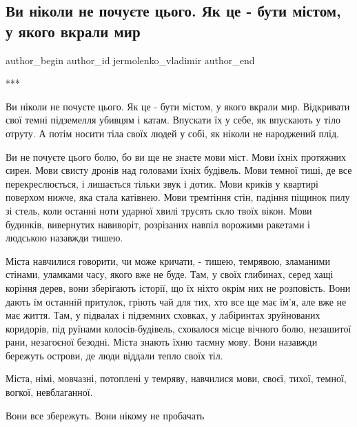  
 
 
 
 

\subsection{Ви ніколи не почуєте цього. Як це - бути містом, у якого вкрали мир}
\label{sec:16_01_2023.fb.jermolenko_vladimir.1.vi_n_koli_ne_pochu_t}

\ifcmt
 author_begin
   author_id jermolenko_vladimir
 author_end
\fi

***

Ви ніколи не почуєте цього. Як це - бути містом, у якого вкрали мир. Відкривати
свої темні підземелля убивцям і катам. Впускати їх у себе, як впускають у тіло
отруту. А потім носити тіла своїх людей у собі, як ніколи не народжений плід.

Ви не почуєте цього болю, бо ви ще не знаєте мови міст. Мови їхніх протяжних
сирен. Мови свисту дронів над головами їхніх будівель. Мови темної тиші, де все
перекреслюється, і лишається тільки звук і дотик. Мови криків у квартирі
поверхом нижче, яка стала катівнею. Мови тремтіння стін, падіння піщинок пилу
зі стель, коли останні ноти ударної хвилі трусять скло твоїх вікон. Мови
будинків, вивернутих навиворіт, розрізаних навпіл ворожими ракетами і людською
назавжди тишею.

Міста навчилися говорити, чи може кричати, - тишею, темрявою, зламаними
стінами, уламками часу, якого вже не буде. Там, у своїх глибинах, серед хащі
коріння дерев, вони зберігають історії, що їх ніхто окрім них не розповість.
Вони дають їм останній притулок, гріють чай для тих, хто все ще має їм’я, але
вже не має життя. Там, у підвалах і підземних сховках, у лабіринтах зруйнованих
коридорів, під руїнами колосів-будівель, сховалося місце вічного болю,
незашитої рани, незагоєної безодні. Міста знають їхню таємну мову. Вони
назавжди бережуть острови, де люди віддали тепло своїх тіл.

Міста, німі, мовчазні, потоплені у темряву, навчилися мови, своєї, тихої,
темної, вогкої, невблаганної.

Вони все збережуть. Вони нікому не пробачать
